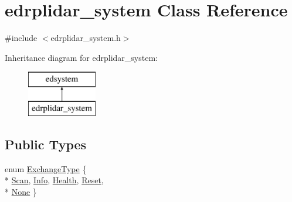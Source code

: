 \hypertarget{classedrplidar__system}{\section{edrplidar\-\_\-system Class Reference}
\label{classedrplidar__system}
}


{\ttfamily \#include $<$edrplidar\-\_\-system.\-h$>$}

Inheritance diagram for edrplidar\-\_\-system\-:\begin{figure}[H]
\begin{center}
\leavevmode
\includegraphics[height=2.000000cm]{classedrplidar__system}
\end{center}
\end{figure}
\subsection*{Public Types}
\begin{DoxyCompactItemize}
\item 
enum \hyperlink{classedrplidar__system_ab0690f6ca603a858d69080303761cd1f}{Exchange\-Type} \{ \\*
\hyperlink{classedrplidar__system_ab0690f6ca603a858d69080303761cd1fa869119dd4a3be62b03f4b5919bec0daf}{Scan}, 
\hyperlink{classedrplidar__system_ab0690f6ca603a858d69080303761cd1fab6bc43008cfd5ed1d2e5ba305efde764}{Info}, 
\hyperlink{classedrplidar__system_ab0690f6ca603a858d69080303761cd1fa32c68bd753b7cd05dc13ba9d0fdeb90f}{Health}, 
\hyperlink{classedrplidar__system_ab0690f6ca603a858d69080303761cd1fa01fc0219e454b92ab9e8c842bfa57d4a}{Reset}, 
\\*
\hyperlink{classedrplidar__system_ab0690f6ca603a858d69080303761cd1faf502cb7101cd1947fdd6c13bcd3f132c}{None}
 \}
\end{DoxyCompactItemize}

